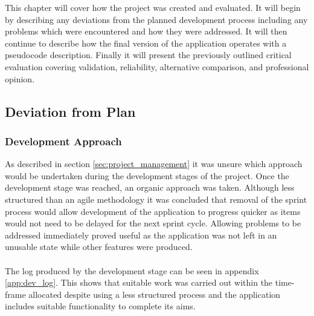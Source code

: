 This chapter will cover how the project was created and evaluated. It will begin by describing any deviations from the planned development process including any problems which were encountered and how they were addressed. It will then continue to describe how the final version of the application operates with a pseudocode description. Finally it will present the previously outlined critical evaluation covering validation, reliability, alternative comparison, and professional opinion.
\subsection{Deviation from Plan}
	\subsubsection{Development Approach}
		As described in section \ref{sec:project_management} it was unsure which approach would be undertaken during the development stages of the project. Once the development stage was reached, an organic approach was taken. Although less structured than an agile methodology it was concluded that removal of the sprint process would allow development of the application to progress quicker as items would not need to be delayed for the next sprint cycle. Allowing problems to be addressed immediately proved useful as the application was not left in an unusable state while other features were produced.
		\\\\
		The log produced by the development stage can be seen in appendix \ref{app:dev_log}. This shows that suitable work was carried out within the time-frame allocated despite using a less structured process and the application includes suitable functionality to complete its aims.

